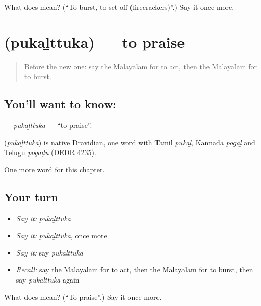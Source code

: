 \begin{tcolorbox}[breakable,colback=teal!4,colframe=teal!35!black,title={Before you move on}]
What does  mean? (\textquotedblleft{}To burst, to set off (firecrackers)\textquotedblright{}.) Say it once more.
\end{tcolorbox}
\section[\texorpdfstring{\ml{പുകഴ്ത്തുക} (pukaḻttuka)}{പുകഴ്ത്തുക (pukaḻttuka)}]{ (pukaḻttuka) — to praise}

\label{lesson:ML-C307-pukalttuka}



\begin{quote}
Before the new one: say the Malayalam for to act, then the Malayalam for to burst.
\end{quote}

\subsection*{You'll want to know: }
\textbf{} — \emph{pukaḻttuka} — \textquotedblleft{}to praise\textquotedblright{}.

\begin{cousinweb}
\textbf{} (\emph{pukaḻttuka}) is native Dravidian, one word with Tamil \emph{pukaḻ}, Kannada \emph{pogaḻ} and Telugu \emph{pogaḍu} (DEDR 4235).
\end{cousinweb}

\begin{grammarlens}[title={What you've built}]
One more word for this chapter.
\end{grammarlens}

\subsection*{Your turn}
\begin{itemize}
\raggedright
  \item \emph{Say it:} \emph{pukaḻttuka}
  \item \emph{Say it:} \emph{pukaḻttuka}, once more
  \item \emph{Say it:} say \emph{pukaḻttuka}
  \item \emph{Recall:} say the Malayalam for to act, then the Malayalam for to burst, then say \emph{pukaḻttuka} again
\end{itemize}

\begin{tcolorbox}[breakable,colback=teal!4,colframe=teal!35!black,title={Before you move on}]
What does  mean? (\textquotedblleft{}To praise\textquotedblright{}.) Say it once more.
\end{tcolorbox}
